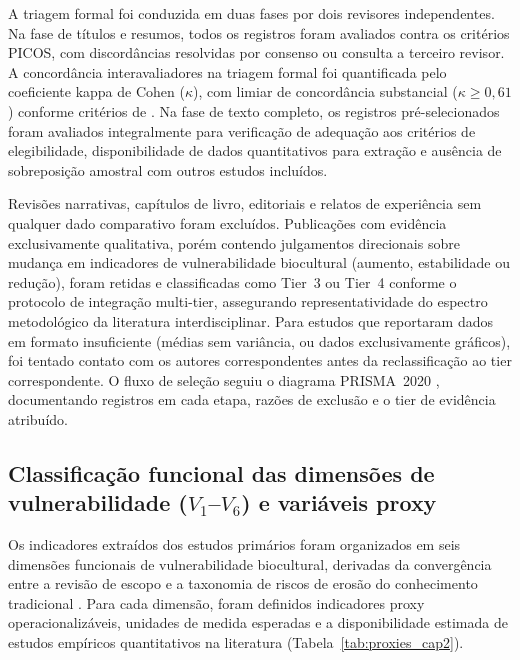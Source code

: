 A triagem formal foi conduzida em duas fases por dois revisores independentes. Na fase de títulos e resumos, todos os registros foram avaliados contra os critérios PICOS, com discordâncias resolvidas por consenso ou consulta a terceiro revisor. A concordância interavaliadores na triagem formal foi quantificada pelo coeficiente kappa de Cohen ($\kappa$), com limiar de concordância substancial ($\kappa \geq 0{,}61$) conforme critérios de . Na fase de texto completo, os registros pré-selecionados foram avaliados integralmente para verificação de adequação aos critérios de elegibilidade, disponibilidade de dados quantitativos para extração e ausência de sobreposição amostral com outros estudos incluídos.

Revisões narrativas, capítulos de livro, editoriais e relatos de experiência sem qualquer dado comparativo foram excluídos. Publicações com evidência exclusivamente qualitativa, porém contendo julgamentos direcionais sobre mudança em indicadores de vulnerabilidade biocultural (aumento, estabilidade ou redução), foram retidas e classificadas como Tier~3 ou Tier~4 conforme o protocolo de integração multi-tier, assegurando representatividade do espectro metodológico da literatura interdisciplinar. Para estudos que reportaram dados em formato insuficiente (médias sem variância, ou dados exclusivamente gráficos), foi tentado contato com os autores correspondentes antes da reclassificação ao tier correspondente. O fluxo de seleção seguiu o diagrama PRISMA~2020 \cite{Page2021}, documentando registros em cada etapa, razões de exclusão e o tier de evidência atribuído.

\subsection{Classificação funcional das dimensões de vulnerabilidade ($V_1$--$V_6$) e variáveis proxy}
\label{sec:dimensions_cap2}

Os indicadores extraídos dos estudos primários foram organizados em seis dimensões funcionais de vulnerabilidade biocultural, derivadas da convergência entre a revisão de escopo e a taxonomia de riscos de erosão do conhecimento tradicional \cite{Agrawal2002}. Para cada dimensão, foram definidos indicadores proxy operacionalizáveis, unidades de medida esperadas e a disponibilidade estimada de estudos empíricos quantitativos na literatura (Tabela~\ref{tab:proxies_cap2}).

